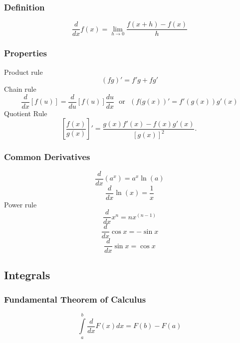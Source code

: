 \documentclass{article}
\begin{document}
		\subsubsection{Definition}
			\begin{equation}
				\frac{d}{{dx}}f\left( x \right) = \mathop {\lim }\limits_{h \to 0} \frac{{f\left( {x + h } \right) - f\left( x \right)}}{h }
			\end{equation}
		\subsubsection{Properties}
			Product rule
			\begin{equation}
				\left(fg\right)'=f'g+fg'
			\end{equation}
			Chain rule
			\begin{equation}
				\frac{d}{{dx}}\left[ {f\left( u \right)} \right] = \frac{d}{{du}}\left[ {f\left( u \right)} \right]\frac{{du}}{{dx}} \ \ \ \mbox{or} \ \ \ \left(f(g(x)\right)'=f'\left(g(x)\right)g'(x)
			\end{equation}
			Quotient Rule
			\begin{equation}
				\left[\frac{f(x)}{g(x)}\right]'=\frac{g(x)f'(x)-f(x)g'(x)}{[g(x)]^2}.\
			\end{equation}
		\subsubsection{Common Derivatives}
			\begin{equation}
				\frac{d}{{dx}}\left(a^x\right)=a^x\ln(a)
			\end{equation}
			\begin{equation}
				\frac{d}{{dx}}\ln \left( x \right) = \frac{1}{x}
			\end{equation}
			Power rule
			\begin{equation}
				\frac{d}{{dx}}x^n = nx^{\left( {n - 1} \right)}
			\end{equation}
			\begin{equation}
				\frac{d}{{dx}}\cos x = -\sin x
			\end{equation}
			\begin{equation}
				\frac{d}{{dx}}\sin x = \cos x
			\end{equation}
	\subsection{Integrals}
		\subsubsection{Fundamental Theorem of Calculus}
			\begin{equation}
			\int\limits_a^b {\frac{d}{{dx}}F\left( x \right)dx} = F\left( b \right) - F\left( a \right)
			\end{equation}
\end{document}
